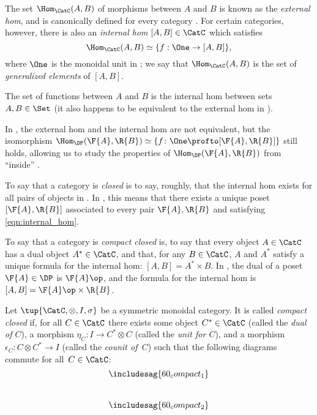 \begin{ctdefinition}
The set $\Hom_\CatC(A,B)$ of morphisms between $A$ and $B$ is known as the \emph{external hom}, and is canonically defined for every category \CatC. For certain categories, however, there is also an \emph{internal hom} $[A,B] \in \CatC$ which satisfies
\begin{equation}
\label{eqn:internal_hom}
\Hom_\CatC(A,B) \simeq \{ f : \One \to [A,B] \},
\end{equation}
where $\One$ is the monoidal unit in \CatC; we say that $\Hom_\CatC(A,B)$ is the set of \emph{generalized elements} of $[A,B]$.
\end{ctdefinition}

\begin{example}
The set of functions between $A$ and $B$ is the internal hom between sets $A,B \in \Set$ (it also happens to be equivalent to the external hom in \Set).
\end{example}

In \DP, the external hom and the internal hom are not equivalent, but the isomorphism $\Hom_\DP(\F{A},\R{B}) \simeq \{ f \colon \One \profto [\F{A},\R{B}] \}$ still holds, allowing us to study the properties of $\Hom_\DP(\F{A},\R{B})$ from ``inside'' \DP.

To say that a category \CatC is \emph{closed} is to say, roughly, that the internal hom exists for all pairs of objects in \CatC. In \DP, this means that there exists a unique poset $[\F{A},\R{B}]$ associated to every pair $\F{A},\R{B}$ and satisfying \cref{eqn:internal_hom}.

To say that a category \CatC is \emph{compact closed} is, to say that every object $A \in \CatC$ has a dual object $A^* \in \CatC$, and that, for any $B \in \CatC$, $A$ and $A^*$ satisfy a unique formula for the internal hom: $[A,B] = A^* \times B$. In \DP, the dual of a poset $\F{A} \in \DP$ is $\F{A}\op$, and the formula for the internal hom is $[A,B]=\F{A}\op \times \R{B}$.

\begin{ctdefinition}
Let $\tup{\CatC,\otimes,I,\sigma}$ be a symmetric monoidal category. It is called \emph{compact closed} if, for all $C \in\CatC$ there exists some object $C^*\in\CatC$ (called the \emph{dual of $C$}), a morphism $\eta_C\colon I\to C^*\otimes C$ (called the \emph{unit for $C$}), and a morphism $\epsilon_C\colon C\otimes C^*\to I$ (called the \emph{counit of~$C$}) such that the following diagrams commute for all~$C\in \CatC$:
\begin{equation}\label{eqn:ccc}
\includesag{60_compact_1}
\end{equation}
~
\begin{equation}
    \includesag{60_compact_2}
\end{equation}
\end{ctdefinition}

